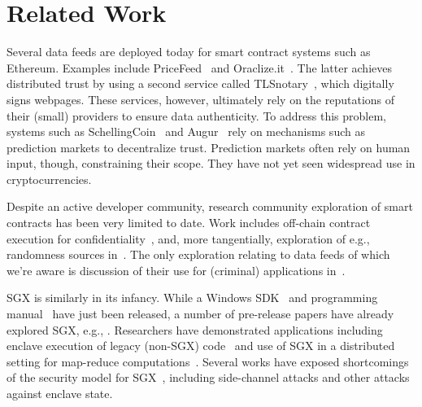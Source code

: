 \section{Related Work}
\label{sec:related}

Several data feeds are deployed today for smart contract systems such as Ethereum. Examples include PriceFeed~\cite{PriceFeed:2016} and Oraclize.it~\cite{Oraclize:2016}. The latter achieves distributed trust by using a second service called TLSnotary~\cite{TLSnotary}, which digitally signs webpages. These services, however, ultimately rely on the reputations of their (small) providers to ensure data authenticity.  To address this problem, systems such as SchellingCoin~\cite{schellingcoin} and Augur~\cite{augur} rely on mechanisms such as prediction markets to decentralize trust. Prediction markets often rely on human input, though, constraining their scope. They have not yet seen widespread use in cryptocurrencies. 

Despite an active developer community, research community exploration of smart contracts has been very limited to date. Work includes off-chain contract execution for confidentiality~\cite{hawk}, and, more tangentially, exploration of e.g., randomness sources in~\cite{bonneau2015bitcoin}. The only exploration relating to data feeds of which we're aware is discussion of their use for (criminal) applications in~\cite{gyges}.

SGX is similarly in its infancy.
While a Windows SDK~\cite{sgxsdk} and programming manual~\cite{sgxmanual} have just been released, a number of pre-release papers have already explored SGX, e.g., \cite{Baumann:2015:SAU:2818727.2799647,7163017,7163052,anati2013innovative,McKeen:2013jv,Phegade:2013km}. Researchers have demonstrated applications including enclave execution of legacy (non-SGX) code~\cite{Haven} and use of SGX in a distributed setting for map-reduce computations~\cite{VC3}. Several works have exposed shortcomings of the security model for SGX~\cite{sgxexplained,sgxsok,shihardwaretalk}, including side-channel attacks and other attacks against enclave state. 


